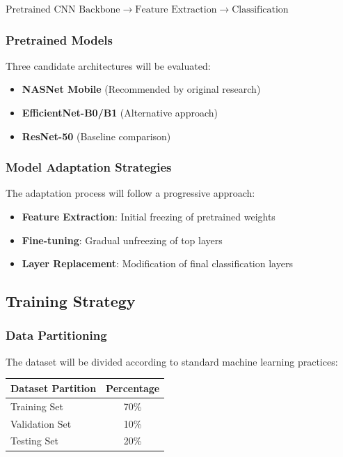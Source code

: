\documentclass[12pt]{article}
\begin{document}
\qquad $\text{Pretrained CNN Backbone} \rightarrow \text{Feature Extraction} \rightarrow \text{Classification}$

\subsubsection{Pretrained Models}
Three candidate architectures will be evaluated:

\begin{itemize}
    \item \textbf{NASNet Mobile} (Recommended by original research)
    \item \textbf{EfficientNet-B0/B1} (Alternative approach)
    \item \textbf{ResNet-50} (Baseline comparison)
\end{itemize}

\subsubsection{Model Adaptation Strategies}
The adaptation process will follow a progressive approach:

\begin{itemize}
    \item \textbf{Feature Extraction}: Initial freezing of pretrained weights
    \item \textbf{Fine-tuning}: Gradual unfreezing of top layers
    \item \textbf{Layer Replacement}: Modification of final classification layers
\end{itemize}

\subsection{Training Strategy}

\subsubsection{Data Partitioning}
The dataset will be divided according to standard machine learning practices:

\begin{table}[H]
\centering
\begin{tabular}{@{}lc@{}}
\toprule
\textbf{Dataset Partition} & \textbf{Percentage} \\
\midrule
Training Set & 70\% \\
Validation Set & 10\% \\
Testing Set & 20\% \\
\bottomrule
\end{tabular}
\end{table}
\end{document}
